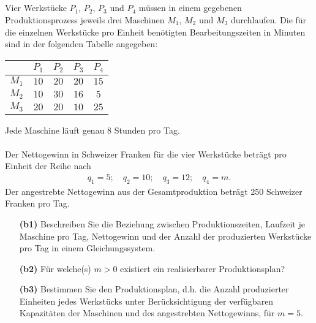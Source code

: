 \subsection*{}
Vier Werkstücke $P_1$, $P_2$, $P_3$ und $P_4$ müssen in einem gegebenen Produktionsprozess jeweils drei Maschinen $M_1$, $M_2$ und $M_3$ durchlaufen.
Die für die einzelnen Werkstücke pro Einheit benötigten Bearbeitungszeiten in Minuten sind in der folgenden Tabelle angegeben: 
\begin{table}[H]
	\centering
	\begin{tabular}{c | c c c c}
		$ $  & $P_1$  &  $P_2$ &  $P_3$ & $P_4$ \\ 
		\hline
		$ M_1 $ & $ 10 $ & $ 20 $ & $ 20 $ & $15$  \\ 
		$ M_2 $ & $ 10 $ & $ 30 $ & $ 16 $ & $5$ \\
		$ M_3 $ & $ 20 $ & $ 20 $ & $ 10 $ & $25$
	\end{tabular}%
\end{table}
Jede Maschine läuft genau $8$ Stunden pro Tag.\\
\\
Der Nettogewinn in Schweizer Franken für die vier Werkstücke beträgt pro Einheit der Reihe nach
\begin{align*}
	q_1 = 5; \quad
	q_2=  10; \quad
	q_3=12; \quad 
	q_4=m.
\end{align*}
Der angestrebte Nettogewinn aus der Gesamtproduktion beträgt $250$ Schweizer Franken pro Tag.
\begin{enumerate}
	\item[\textbf{(b1)}]
	Beschreiben Sie die Beziehung zwischen Produktionszeiten, Laufzeit je Maschine pro Tag, Nettogewinn und der Anzahl der produzierten Werkstücke pro Tag in einem Gleichungssystem.

	\item[\textbf{(b2)}] 
	Für welche(s) $m > 0$ existiert ein realisierbarer Produktionsplan?
	\item[\textbf{(b3)}]
	Bestimmen Sie den Produktionsplan, d.h. die Anzahl produzierter Einheiten jedes Werkstücks unter Berücksichtigung der verfügbaren Kapazitäten der Maschinen und des angestrebten Nettogewinns, für $m = 5$.
\end{enumerate}
\ \\
